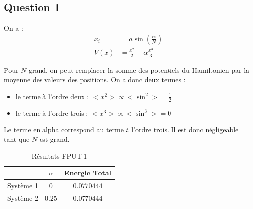 \documentclass[a4paper, 11pt]{article}
\begin{document}
\subsection*{Question 1}
On a : 
\begin{align*}
    x_i &= a \sin(\frac{i \pi}N) \\ 
    V (x) &= \frac{x^2}2 + \alpha \frac{x^3}3
\end{align*}

Pour $N$ grand, on peut remplacer la somme des potentiels du Hamiltonien par la moyenne des valeurs des positions. On a donc deux termes : 
\begin{itemize}
    \item le terme à l'ordre deux : $<x^2> \propto <\sin^2> = \frac 12$
    \item le terme à l'ordre trois : $<x^3> \propto <\sin^3> = 0$
\end{itemize}

Le terme en alpha correspond au terme à l'ordre trois. Il est donc négligeable tant que $N$ est grand.

\begin{table}[H]
    \centering
    \begin{tabular}{|c | c | c |}
    \hline
         & $\alpha$ & Energie Total\\
    \hline\hline
        Système 1 & $0$ & $0.0770444$\\\hline
        Système 2 & $0.25$ & $0.0770444$\\
    \hline
    \end{tabular}
    \caption{Résultats FPUT 1}
    \label{tab:FPUT1}
\end{table}
\end{document}

